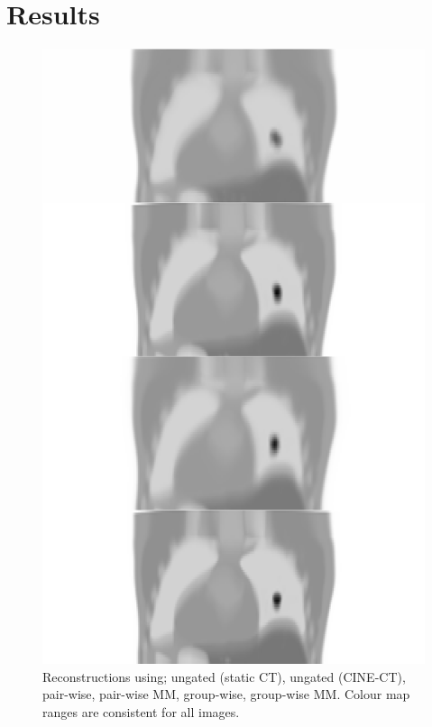 \section{Results} \label{sec:results}
    \begin{figure}
        \vspace{-0.3cm}
        
        \centering
        
        \includegraphics[width=1.0\linewidth]{figures/visual_analysis.png}
        
        \vspace{-0.3cm}
        
        \captionsetup{singlelinecheck=false, justification=centering}
        \caption{Reconstructions using; ungated (static \gls{CT}), ungated (CINE-\gls{CT}), pair-wise, pair-wise \gls{MM}, group-wise, group-wise \gls{MM}. Colour map ranges are consistent for all images.}
        
        \label{fig:visual_analysis}
        
        \vspace{-0.3cm}
    \end{figure}
    
